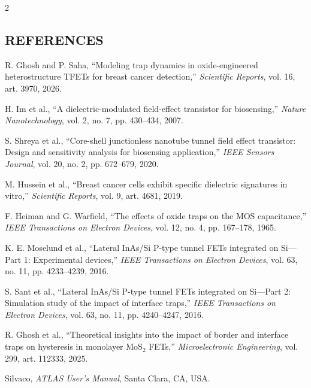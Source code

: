 \begin{multicols}{2}
  \subsection*{\centering\uppercase{References}}
  {\small
  \begin{justify}
    \begin{enumerate}[label={\relax[\arabic*]},leftmargin=*,labelsep=0.5em,itemsep=0.20em,parsep=0pt]
      \item R. Ghosh and P. Saha, “Modeling trap dynamics in oxide-engineered heterostructure TFETs for breast cancer detection,” \textit{Scientific Reports}, vol. 16, art. 3970, 2026.
      \item H. Im et al., “A dielectric-modulated field-effect transistor for biosensing,” \textit{Nature Nanotechnology}, vol. 2, no. 7, pp. 430--434, 2007.
      \item S. Shreya et al., “Core-shell junctionless nanotube tunnel field effect transistor: Design and sensitivity analysis for biosensing application,” \textit{IEEE Sensors Journal}, vol. 20, no. 2, pp. 672--679, 2020.
      \item M. Hussein et al., “Breast cancer cells exhibit specific dielectric signatures in vitro,” \textit{Scientific Reports}, vol. 9, art. 4681, 2019.
      \item F. Heiman and G. Warfield, “The effects of oxide traps on the MOS capacitance,” \textit{IEEE Transactions on Electron Devices}, vol. 12, no. 4, pp. 167--178, 1965.
      \item K. E. Moselund et al., “Lateral InAs/Si P-type tunnel FETs integrated on Si---Part 1: Experimental devices,” \textit{IEEE Transactions on Electron Devices}, vol. 63, no. 11, pp. 4233--4239, 2016.
      \item S. Sant et al., “Lateral InAs/Si P-type tunnel FETs integrated on Si---Part 2: Simulation study of the impact of interface traps,” \textit{IEEE Transactions on Electron Devices}, vol. 63, no. 11, pp. 4240--4247, 2016.
      \item R. Ghosh et al., “Theoretical insights into the impact of border and interface traps on hysteresis in monolayer MoS$_2$ FETs,” \textit{Microelectronic Engineering}, vol. 299, art. 112333, 2025.
      \item Silvaco, \textit{ATLAS User's Manual}, Santa Clara, CA, USA.
    \end{enumerate}
    \end{justify}}
\end{multicols}
